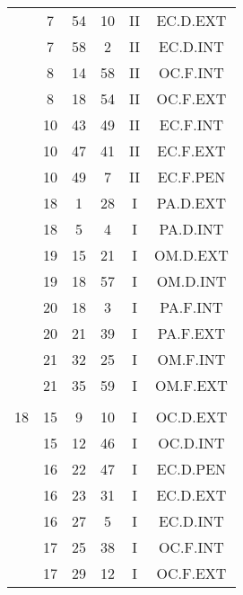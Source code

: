 \documentclass[12pt, a4paper]{article}
\begin{document}
\begin{multicols}{3}
{\begin{tabular}{c c c c c c}
	 	 	 	 & 7 & 54 & 10 & II & EC.D.EXT\\%
	 	 	 	 & 7 & 58 & 2 & II & EC.D.INT\\%
	 	 	 	 & 8 & 14 & 58 & II & OC.F.INT\\%
	 	 	 	 & 8 & 18 & 54 & II & OC.F.EXT\\%
	 	 	 	 & 10 & 43 & 49 & II & EC.F.INT\\%
	 	 	 	 & 10 & 47 & 41 & II & EC.F.EXT\\%
	 	 	 	 & 10 & 49 & 7 & II & EC.F.PEN\\%
	 	 	 	 & 18 & 1 & 28 & I & PA.D.EXT\\%
	 	 	 	 & 18 & 5 & 4 & I & PA.D.INT\\%
	 	 	 	 & 19 & 15 & 21 & I & OM.D.EXT\\%
	 	 	 	 & 19 & 18 & 57 & I & OM.D.INT\\%
	 	 	 	 & 20 & 18 & 3 & I & PA.F.INT\\%
	 	 	 	 & 20 & 21 & 39 & I & PA.F.EXT\\%
	 	 	 	 & 21 & 32 & 25 & I & OM.F.INT\\%
	 	 	 	 & 21 & 35 & 59 & I & OM.F.EXT\\%
	 	 	 	 & & & & & \\%
	 	 	 	18 & 15 & 9 & 10 & I & OC.D.EXT\\%
	 	 	 	 & 15 & 12 & 46 & I & OC.D.INT\\%
	 	 	 	 & 16 & 22 & 47 & I & EC.D.PEN\\%
	 	 	 	 & 16 & 23 & 31 & I & EC.D.EXT\\%
	 	 	 	 & 16 & 27 & 5 & I & EC.D.INT\\%
	 	 	 	 & 17 & 25 & 38 & I & OC.F.INT\\%
	 	 	 	 & 17 & 29 & 12 & I & OC.F.EXT\\%

\end{tabular}}
\end{multicols}
\end{document}
